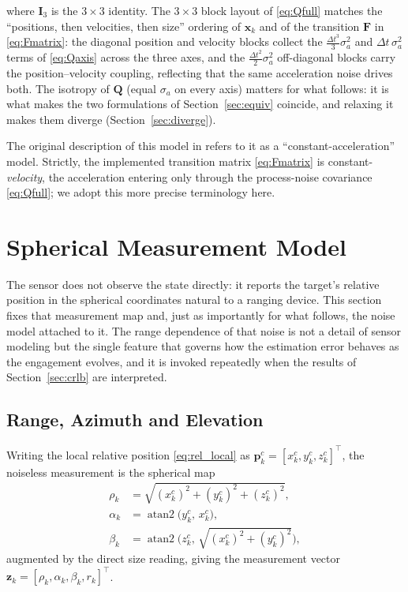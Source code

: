 where $\bm{I}_3$ is the $3\times3$ identity. The $3\times3$ block layout of
\eqref{eq:Qfull} matches the ``positions, then velocities, then size'' ordering of
$\bm{x}_k$ and of the transition $\bm{F}$ in \eqref{eq:Fmatrix}: the diagonal
position and velocity blocks collect the $\tfrac{\Delta t^{3}}{3}\sigma_a^2$ and
$\Delta t\,\sigma_a^2$ terms of \eqref{eq:Qaxis} across the three axes, and the
$\tfrac{\Delta t^{2}}{2}\sigma_a^2$ off-diagonal blocks carry the
position--velocity coupling, reflecting that the same acceleration noise drives
both. The isotropy of $\bm{Q}$ (equal $\sigma_a$ on every axis) matters for what
follows: it is what makes the two formulations of Section~\ref{sec:equiv}
coincide, and relaxing it makes them diverge (Section~\ref{sec:diverge}).

\begin{remark}
The original description of this model in  refers to it as
a ``constant-acceleration'' model. Strictly, the implemented transition matrix
\eqref{eq:Fmatrix} is constant-\emph{velocity}, the acceleration entering only
through the process-noise covariance \eqref{eq:Qfull}; we adopt this more precise
terminology here.
\end{remark}

\section{Spherical Measurement Model}

The sensor does not observe the state directly: it reports the target's relative
position in the spherical coordinates natural to a ranging device. This section
fixes that measurement map and, just as importantly for what follows, the noise
model attached to it. The range dependence of that noise is not a detail of
sensor modeling but the single feature that governs how the estimation error
behaves as the engagement evolves, and it is invoked repeatedly when the results
of Section~\ref{sec:crlb} are interpreted.

\subsection{Range, Azimuth and Elevation}

Writing the local relative position \eqref{eq:rel_local} as
$\bm{p}^{c}_k=[x^{c}_k,y^{c}_k,z^{c}_k]^\top$, the noiseless measurement is the
spherical map
\begin{align}
  \rho_k   &= \sqrt{(x^{c}_k)^{2}+(y^{c}_k)^{2}+(z^{c}_k)^{2}}, \label{eq:rho}\\
  \alpha_k &= \operatorname{atan2}\!\big(y^{c}_k,\, x^{c}_k\big), \label{eq:alpha}\\
  \beta_k  &= \operatorname{atan2}\!\Big(z^{c}_k,\, \sqrt{(x^{c}_k)^{2}+(y^{c}_k)^{2}}\Big), \label{eq:beta}
\end{align}
augmented by the direct size reading, giving the measurement vector
$\bm{z}_k=[\rho_k,\alpha_k,\beta_k,r_k]^{\top}$.

